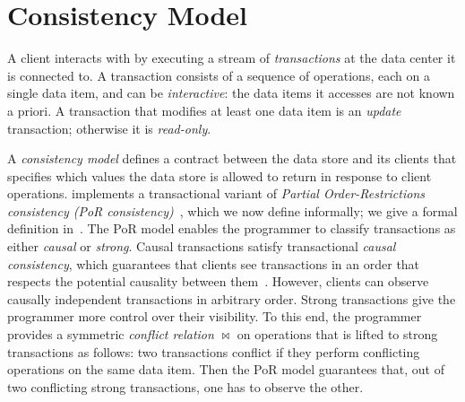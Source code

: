 \section{Consistency Model}
\label{sec:consistency}



A client interacts with \System by executing a stream of {\em transactions} at
the data center it is connected to. A transaction consists of a sequence of
operations, each on a single data item, and can be {\em interactive}: the data
items it accesses are not known a priori. A transaction that modifies at least
one data item is an {\em update} transaction; otherwise it is {\em read-only}.













A {\em consistency model} defines a contract between the data store and its
clients that specifies which values the data store is allowed to return in
response to client operations. \System implements a transactional variant of
{\em Partial Order-Restrictions consistency (PoR
  consistency)}~\cite{por,cise-popl16}, which we now define informally; we give
a formal definition in~\tr{\ref{section:spec}}{\nappconsistency}.
The PoR model enables the programmer to classify transactions as either {\em causal} or
{\em strong}. Causal transactions satisfy transactional {\em causal
  consistency}, which guarantees that clients see transactions in an order that
respects the potential causality between them~\cite{causal-memory,cure}.
However, clients can observe causally independent transactions in arbitrary
order. Strong transactions give the programmer more control over their
visibility. To this end, the programmer provides a symmetric {\em conflict
  relation} $\bowtie$ on operations
that is lifted to strong transactions as follows: two transactions conflict
if they perform conflicting operations on the same data item. Then the PoR model
guarantees that,
out of two conflicting strong transactions, one has to observe the
other.

